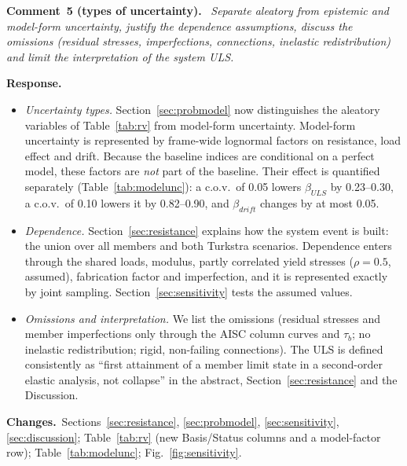 \documentclass[11pt]{article}
\newcounter{rc}
\newenvironment{comment}[1]{\refstepcounter{rc}\par\medskip\noindent\textbf{Comment~#1.}\ \itshape}{\par}
\newcommand{\resp}{\par\noindent\textbf{Response.}\ }
\newcommand{\chg}{\par\noindent\textbf{Changes.}\ }
\begin{document}
\begin{comment}{5 (types of uncertainty)}
Separate aleatory from epistemic and model-form uncertainty, justify the dependence assumptions, discuss
the omissions (residual stresses, imperfections, connections, inelastic redistribution) and limit the
interpretation of the system ULS.
\end{comment}
\resp
\begin{itemize}[itemsep=0.1em]
\item \emph{Uncertainty types.} Section~\ref{sec:probmodel} now distinguishes the aleatory variables
of Table~\ref{tab:rv} from model-form uncertainty. Model-form uncertainty is represented by frame-wide
lognormal factors on resistance, load effect and drift. Because the baseline indices are conditional
on a perfect model, these factors are \emph{not} part of the baseline. Their effect is quantified
separately (Table~\ref{tab:modelunc}): a c.o.v.\ of 0.05 lowers $\beta_{ULS}$ by 0.23--0.30, a c.o.v.\
of 0.10 lowers it by 0.82--0.90, and $\beta_{drift}$ changes by at most 0.05.
\item \emph{Dependence.} Section~\ref{sec:resistance} explains how the system event is built: the
union over all members and both Turkstra scenarios. Dependence enters through the shared loads,
modulus, partly correlated yield stresses ($\rho=0.5$, assumed), fabrication factor and imperfection,
and it is represented exactly by joint sampling. Section~\ref{sec:sensitivity} tests the assumed
values.
\item \emph{Omissions and interpretation.} We list the omissions (residual stresses and member
imperfections only through the AISC column curves and $\tau_b$; no inelastic redistribution; rigid,
non-failing connections). The ULS is defined consistently as ``first attainment of a member limit
state in a second-order elastic analysis, not collapse'' in the abstract, Section~\ref{sec:resistance}
and the Discussion.
\end{itemize}
\chg Sections~\ref{sec:resistance}, \ref{sec:probmodel}, \ref{sec:sensitivity},
\ref{sec:discussion}; Table~\ref{tab:rv} (new Basis/Status columns and a model-factor row);
Table~\ref{tab:modelunc}; Fig.~\ref{fig:sensitivity}.
\end{document}
